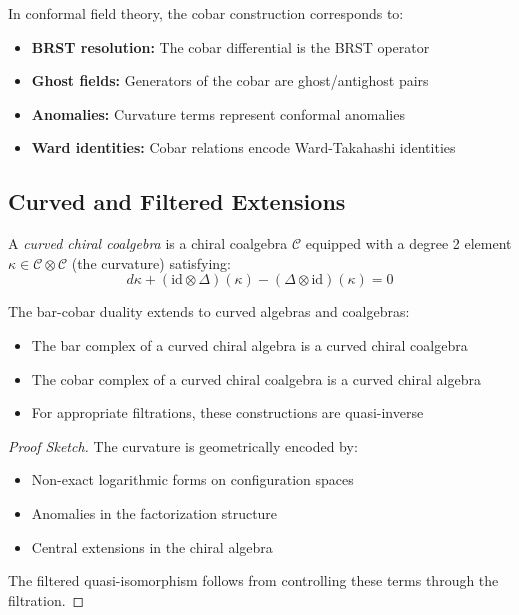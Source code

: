 \begin{remark}
In conformal field theory, the cobar construction corresponds to:
\begin{itemize}
\item \textbf{BRST resolution:} The cobar differential is the BRST operator
\item \textbf{Ghost fields:} Generators of the cobar are ghost/antighost pairs
\item \textbf{Anomalies:} Curvature terms represent conformal anomalies
\item \textbf{Ward identities:} Cobar relations encode Ward-Takahashi identities
\end{itemize}
\end{remark}

\subsection{Curved and Filtered Extensions}

\begin{definition}\label{def:curved-chiral}
A \emph{curved chiral coalgebra} is a chiral coalgebra $\mathcal{C}$ equipped with a degree 2 element $\kappa \in \mathcal{C} \otimes \mathcal{C}$ (the curvature) satisfying:
\[
d\kappa + (\text{id} \otimes \Delta)(\kappa) - (\Delta \otimes \text{id})(\kappa) = 0
\]
\end{definition}

\begin{theorem}\label{thm:curved-duality}
The bar-cobar duality extends to curved algebras and coalgebras:
\begin{itemize}
\item The bar complex of a curved chiral algebra is a curved chiral coalgebra
\item The cobar complex of a curved chiral coalgebra is a curved chiral algebra
\item For appropriate filtrations, these constructions are quasi-inverse
\end{itemize}
\end{theorem}

\begin{proof}[Proof Sketch]
The curvature is geometrically encoded by:
\begin{itemize}
\item Non-exact logarithmic forms on configuration spaces
\item Anomalies in the factorization structure
\item Central extensions in the chiral algebra
\end{itemize}
The filtered quasi-isomorphism follows from controlling these terms through the filtration.
\end{proof}

